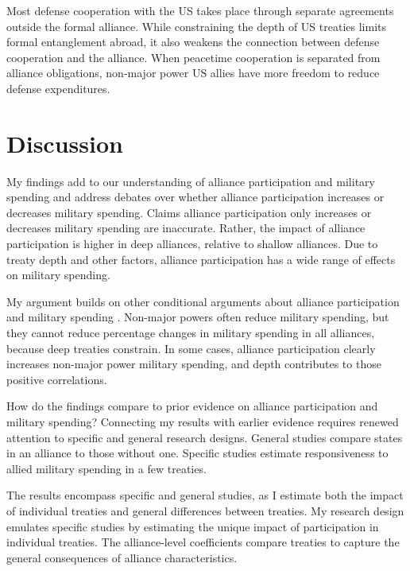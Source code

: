 \documentclass[12pt]{article}
\begin{document}
Most defense cooperation with the US takes place through separate agreements outside the formal alliance. 
While constraining the depth of US treaties limits formal entanglement abroad, it also weakens the connection between defense cooperation and the alliance. 
When peacetime cooperation is separated from alliance obligations, non-major power US allies have more freedom to reduce defense expenditures. 



\section{Discussion}


My findings add to our understanding of alliance participation and military spending and address debates over whether alliance participation increases or decreases military spending. 
Claims alliance participation only increases or decreases military spending are inaccurate. 
Rather, the impact of alliance participation is higher in deep alliances, relative to shallow alliances.
Due to treaty depth and other factors, alliance participation has a wide range of effects on military spending. 


My argument builds on other conditional arguments about alliance participation and military spending \citep{DigiuseppePoast2016}. 
Non-major powers often reduce military spending, but they cannot reduce percentage changes in military spending in all alliances, because deep treaties constrain.
In some cases, alliance participation clearly increases non-major power military spending, and depth contributes to those positive correlations. 


How do the findings compare to prior evidence on alliance participation and military spending? 
Connecting my results with earlier evidence requires renewed attention to specific and general research designs. 
General studies compare states in an alliance to those without one. 
Specific studies estimate responsiveness to allied military spending in a few treaties. 


The results encompass specific and general studies, as I estimate both the impact of individual treaties and general differences between treaties. 
My research design emulates specific studies by estimating the unique impact of participation in individual treaties. 
The alliance-level coefficients compare treaties to capture the general consequences of alliance characteristics. 
\end{document}
